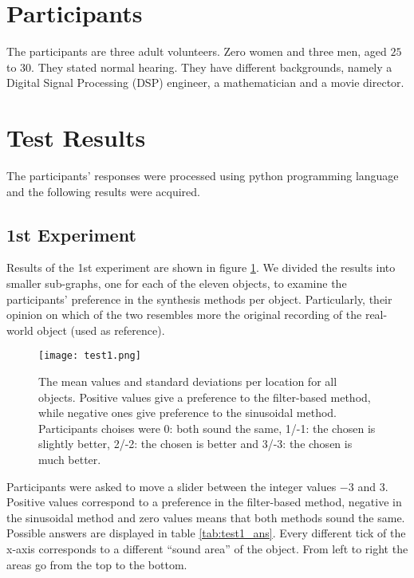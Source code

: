 \section{Participants}
The participants are three adult volunteers. Zero women and three men, aged $25$ to $30$. They stated normal hearing. They have different backgrounds, namely a Digital Signal Processing (DSP) engineer, a mathematician and a movie director.

\section{Test Results}
The participants' responses were processed using python programming language and the following results were acquired.

\subsection{1st Experiment}
Results of the 1st experiment are shown in figure \ref{fig:test1}. We divided the results into smaller sub-graphs, one for each of the eleven objects, to examine the participants' preference in the synthesis methods per object. Particularly, their opinion on which of the two resembles more the original recording of the real-world object (used as reference).

\begin{figure}[H]
  \centering
    \texttt{[image: test1.png]}
      \caption{The mean values and standard deviations per location for all objects. Positive values give a preference to the filter-based method, while negative ones give preference to the sinusoidal method. Participants choises were 0: both sound the same, 1/-1: the chosen is slightly better, 2/-2: the chosen is better and 3/-3: the chosen is much better.}\label{fig:test1}
\end{figure}

Participants were asked to move a slider between the integer values $-3$ and $3$. Positive values correspond to a preference in the filter-based method, negative in the sinusoidal method and zero values means that both methods sound the same. Possible answers are displayed in table \ref{tab:test1_ans}. Every different tick of the x-axis corresponds to a different ``sound area'' of the object. From left to right the areas go from the top to the bottom.


